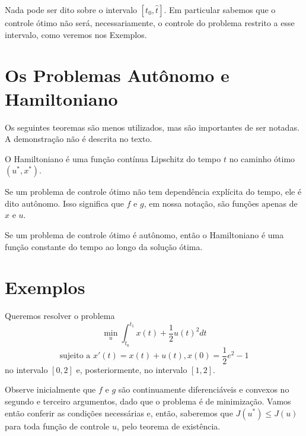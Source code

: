 \begin{remark}
    Nada pode ser dito sobre o intervalo $[t_0, \hat{t}]$. Em particular sabemos que o controle ótimo não será, necessariamente, o controle do problema restrito a esse intervalo, como veremos nos Exemplos. 
\end{remark}

\section{Os Problemas Autônomo e Hamiltoniano}

Os seguintes teoremas são menos utilizados, mas são importantes de ser notadas. A demonstração não é descrita no texto. 

\begin{theorem}
    O Hamiltoniano é uma função contínua Lipschitz do tempo $t$ no caminho
    ótimo $(u^*, x^*)$. 
\end{theorem}

\begin{definition}[Autônomo]
    Se um problema de controle ótimo não tem dependência explícita do tempo,
    ele é dito autônomo. Isso significa que $f$ e $g$, em nossa notação, são
    funções apenas de $x$ e $u$. 
\end{definition}

\begin{theorem}
    Se um problema de controle ótimo é autônomo, então o Hamiltoniano é uma
    função constante do tempo ao longo da solução ótima. 
\end{theorem}

\section{Exemplos}

\begin{example}
    Queremos resolver o problema 
    $$
    \min_u \int_{t_0}^{t_1} x(t) + \frac{1}{2}u(t)^2 dt
    $$
    $$  
    \text{sujeito a  }x'(t) = x(t) + u(t), x(0) = \frac{1}{2}e^2 - 1
    $$
    no intervalo $[0,2]$ e, posteriormente, no intervalo $[1,2]$.
\end{example}

Observe inicialmente que $f$ e $g$ são continuamente diferenciáveis e convexos no segundo 
e terceiro argumentos, dado que o problema é de minimização. Vamos então conferir as condições 
necessárias e, então, saberemos que $J(u^*) \le J(u)$ para toda função de controle $u$, pelo 
teorema de existência. 

